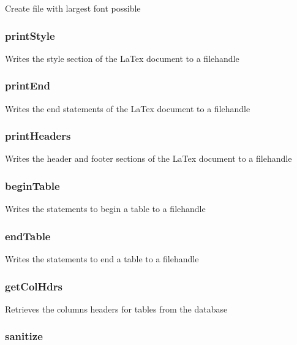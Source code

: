 \documentclass{article}
\begin{document}
Create file with largest font possible

\subsubsection*{printStyle\label{Print_printStyle}}


Writes the style section of the LaTex document to a filehandle

\subsubsection*{printEnd\label{Print_printEnd}}


Writes the end statements of the LaTex document to a filehandle

\subsubsection*{printHeaders\label{Print_printHeaders}}


Writes the header and footer sections of the LaTex document to a filehandle

\subsubsection*{beginTable\label{Print_beginTable}}


Writes the statements to begin a table to a filehandle

\subsubsection*{endTable\label{Print_endTable}}


Writes the statements to end a table to a filehandle

\subsubsection*{getColHdrs\label{Print_getColHdrs}}


Retrieves the columns headers for tables from the database

\subsubsection*{sanitize\label{Print_sanitize}}
\end{document}
